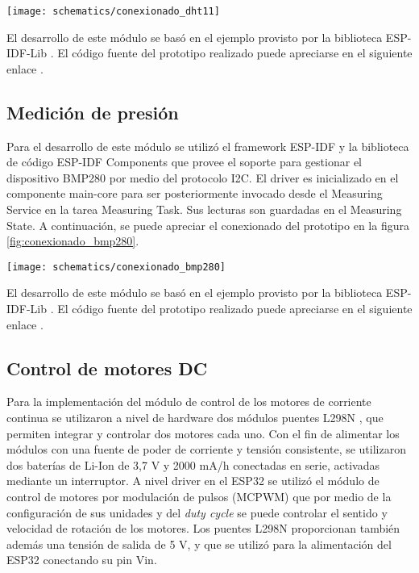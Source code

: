 \begin{center}
\texttt{[image: schematics/conexionado\_dht11]}
  \label{fig:conexionado_dht11}
\end{center}

El desarrollo de este módulo se basó en el ejemplo provisto por la biblioteca ESP-IDF-Lib \cite{ESP32_dht11_example}. El código fuente del prototipo realizado puede apreciarse en el siguiente enlace \cite{ESP32_POC_dht11}.

\subsection{Medición de presión}
Para el desarrollo de este módulo se utilizó el framework ESP-IDF y la biblioteca de código ESP-IDF Components que provee el soporte para gestionar el dispositivo BMP280 por medio del protocolo I2C. El driver es inicializado en el componente main-core para ser posteriormente invocado desde el Measuring Service en la tarea Measuring Task. Sus lecturas son guardadas en el Measuring State. A continuación, se puede apreciar el conexionado del prototipo en la figura \ref{fig:conexionado_bmp280}.
\begin{center}
\texttt{[image: schematics/conexionado\_bmp280]}
  \label{fig:conexionado_bmp280}
\end{center}

El desarrollo de este módulo se basó en el ejemplo provisto por la biblioteca ESP-IDF-Lib \cite{ESP32_bmp280_example}. El código fuente del prototipo realizado puede apreciarse en el siguiente enlace \cite{ESP32_POC_bmp280}.


\subsection{Control de motores DC}

Para la implementación del módulo de control de los motores de corriente continua se utilizaron a nivel de hardware dos módulos puentes L298N \cite{L298N}, que permiten integrar y controlar dos motores cada uno. Con el fin de alimentar los módulos con una fuente de poder de corriente y tensión consistente, se utilizaron dos baterías de Li-Ion de 3,7 V y 2000 mA/h conectadas en serie, activadas mediante un interruptor.
A nivel driver en el ESP32 se utilizó el módulo de control de motores por modulación de pulsos (MCPWM) \cite{ESP32_MCPWM} que por medio de la configuración de sus unidades y del \textit{duty cycle} \cite{ESP32_MCPWM_2} se puede controlar el sentido y velocidad de rotación de los motores.
Los puentes L298N proporcionan también además una tensión de salida de 5 V, y que se utilizó para la alimentación del ESP32 conectando su pin Vin.

